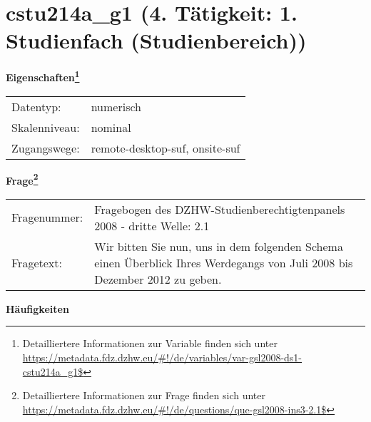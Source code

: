 
    \setcounter{footnote}{0}

    \vspace*{-1.8cm}
	\section{cstu214a\_g1 (4. Tätigkeit: 1. Studienfach (Studienbereich))}
	\label{section:cstu214a_g1}



    \vspace*{0.5cm}
    \noindent\textbf{Eigenschaften\footnote{Detailliertere Informationen zur Variable finden sich unter
		\url{https://metadata.fdz.dzhw.eu/\#!/de/variables/var-gsl2008-ds1-cstu214a_g1$}}}\\
	\begin{tabularx}{\hsize}{@{}lX}
	Datentyp: & numerisch \\
	Skalenniveau: & nominal \\
	Zugangswege: &
	  remote-desktop-suf, 
	  onsite-suf
 \\
    \end{tabularx}



				\vspace*{0.5cm}
                \noindent\textbf{Frage\footnote{Detailliertere Informationen zur Frage finden sich unter
		              \url{https://metadata.fdz.dzhw.eu/\#!/de/questions/que-gsl2008-ins3-2.1$}}}\\
				\begin{tabularx}{\hsize}{@{}lX}
					Fragenummer: &
					  Fragebogen des DZHW-Studienberechtigtenpanels 2008 - dritte Welle:
					  2.1
 \\
					Fragetext: & Wir bitten Sie nun, uns in dem folgenden Schema einen Überblick Ihres Werdegangs von Juli 2008 bis Dezember 2012 zu geben. \\
				\end{tabularx}





        		\vspace*{0.5cm}
                \noindent\textbf{Häufigkeiten}

